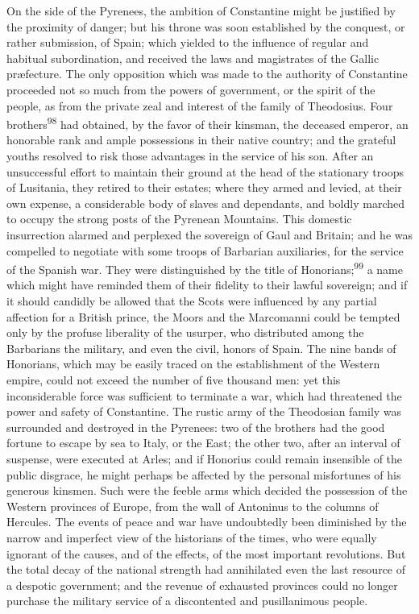 On the side of the Pyrenees, the ambition of Constantine might be
justified by the proximity of danger; but his throne was soon
established by the conquest, or rather submission, of Spain;
which yielded to the influence of regular and habitual
subordination, and received the laws and magistrates of the
Gallic præfecture. The only opposition which was made to the
authority of Constantine proceeded not so much from the powers of
government, or the spirit of the people, as from the private zeal
and interest of the family of Theodosius. Four brothers\textsuperscript{98} had
obtained, by the favor of their kinsman, the deceased emperor, an
honorable rank and ample possessions in their native country; and
the grateful youths resolved to risk those advantages in the
service of his son. After an unsuccessful effort to maintain
their ground at the head of the stationary troops of Lusitania,
they retired to their estates; where they armed and levied, at
their own expense, a considerable body of slaves and dependants,
and boldly marched to occupy the strong posts of the Pyrenean
Mountains. This domestic insurrection alarmed and perplexed the
sovereign of Gaul and Britain; and he was compelled to negotiate
with some troops of Barbarian auxiliaries, for the service of the
Spanish war. They were distinguished by the title of Honorians;\textsuperscript{99}
a name which might have reminded them of their fidelity to
their lawful sovereign; and if it should candidly be allowed that
the Scots were influenced by any partial affection for a British
prince, the Moors and the Marcomanni could be tempted only by the
profuse liberality of the usurper, who distributed among the
Barbarians the military, and even the civil, honors of Spain. The
nine bands of Honorians, which may be easily traced on the
establishment of the Western empire, could not exceed the number
of five thousand men: yet this inconsiderable force was
sufficient to terminate a war, which had threatened the power and
safety of Constantine. The rustic army of the Theodosian family
was surrounded and destroyed in the Pyrenees: two of the brothers
had the good fortune to escape by sea to Italy, or the East; the
other two, after an interval of suspense, were executed at Arles;
and if Honorius could remain insensible of the public disgrace,
he might perhaps be affected by the personal misfortunes of his
generous kinsmen. Such were the feeble arms which decided the
possession of the Western provinces of Europe, from the wall of
Antoninus to the columns of Hercules. The events of peace and war
have undoubtedly been diminished by the narrow and imperfect view
of the historians of the times, who were equally ignorant of the
causes, and of the effects, of the most important revolutions.
But the total decay of the national strength had annihilated even
the last resource of a despotic government; and the revenue of
exhausted provinces could no longer purchase the military service
of a discontented and pusillanimous people.

